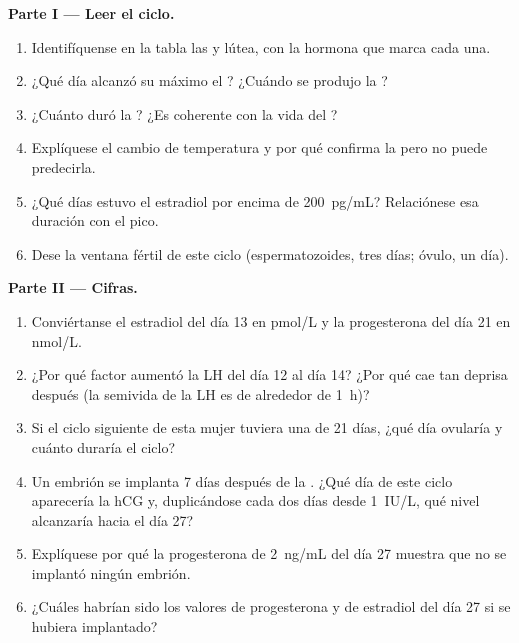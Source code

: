 \begin{problem}
\medskip
\noindent\textbf{Parte I --- Leer el ciclo.}
\begin{enumerate}
  \item Identifíquense en la tabla las  y lútea, con la
        hormona que marca cada una.
  \item ¿Qué día alcanzó su máximo el ? ¿Cuándo se produjo la
        ?
  \item ¿Cuánto duró la ? ¿Es coherente con la vida del ?
  \item Explíquese el cambio de temperatura y por qué confirma la
         pero no puede predecirla.
  \item ¿Qué días estuvo el estradiol por encima de \qty{200}{pg/mL}?
        Relaciónese esa duración con el pico.
  \item Dese la ventana fértil de este ciclo (espermatozoides, tres días;
        óvulo, un día).
\end{enumerate}

\medskip
\noindent\textbf{Parte II --- Cifras.}
\begin{enumerate}[resume]
  \item Conviértanse el estradiol del día 13 en \unit{pmol/L} y la
        progesterona del día 21 en \unit{nmol/L}.
  \item ¿Por qué factor aumentó la LH del día 12 al día 14? ¿Por qué cae
        tan deprisa después (la semivida de la LH es de alrededor de
        \qty{1}{h})?
  \item Si el ciclo siguiente de esta mujer tuviera una  de
        21 días, ¿qué día ovularía y cuánto duraría el ciclo?
  \item Un embrión se implanta 7 días después de la . ¿Qué día de
        este ciclo aparecería la hCG y, duplicándose cada dos días desde
        \qty{1}{IU/L}, qué nivel alcanzaría hacia el día 27?
  \item Explíquese por qué la progesterona de \qty{2}{ng/mL} del día 27
        muestra que no se implantó ningún embrión.
  \item ¿Cuáles habrían sido los valores de progesterona y de estradiol
        del día 27 si se hubiera implantado?
\end{enumerate}


\end{problem}
